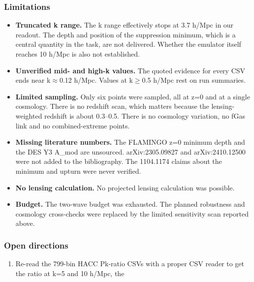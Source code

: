 \documentclass[11pt,a4paper]{article}
\begin{document}
\subsubsection*{Limitations}
\begin{itemize}
  \item \textbf{Truncated k range.} The k range effectively stops at 3.7 h/Mpc in our readout. The depth and position of the suppression minimum, which is a central quantity in the task, are not delivered. Whether the emulator itself reaches 10 h/Mpc is also not established.
  \item \textbf{Unverified mid- and high-k values.} The quoted evidence for every CSV ends near k$\approx$0.12 h/Mpc. Values at k$\geq$0.5 h/Mpc rest on run summaries.
  \item \textbf{Limited sampling.} Only six points were sampled, all at z=0 and at a single cosmology. There is no redshift scan, which matters because the lensing-weighted redshift is about 0.3--0.5. There is no cosmology variation, no fGas link and no combined-extreme points.
  \item \textbf{Missing literature numbers.} The FLAMINGO z=0 minimum depth and the DES Y3 A\_mod are unsourced. arXiv:2305.09827 and arXiv:2410.12500 were not added to the bibliography. The 1104.1174 claims about the minimum and upturn were never verified.
  \item \textbf{No lensing calculation.} No projected lensing calculation was possible.
  \item \textbf{Budget.} The two-wave budget was exhausted. The planned robustness and cosmology cross-checks were replaced by the limited sensitivity scan reported above.
\end{itemize}
\subsubsection*{Open directions}
\begin{enumerate}
  \item Re-read the 799-bin HACC Pk-ratio CSVs with a proper CSV reader to get the ratio at k=5 and 10 h/Mpc, the
\end{enumerate}
\end{document}
